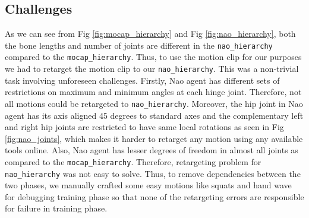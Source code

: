 \subsection{Challenges}
As we can see from Fig \ref{fig:mocap_hierarchy} and Fig \ref{fig:nao_hierarchy}, both the bone lengths and number of joints are different in the \texttt{nao\_hierarchy} compared to the \texttt{mocap\_hierarchy}. Thus, to use the motion clip for our purposes we had to retarget the motion clip to our \texttt{nao\_hierarchy}. This was a non-trivial task involving unforeseen challenges. 
Firstly, Nao agent has different sets of restrictions on maximum and minimum angles at each hinge joint. Therefore, not all motions could be retargeted to \texttt{nao\_hierarchy}. Moreover, the hip joint in Nao agent has its axis aligned 45 degrees to standard axes and the complementary left and right hip joints are restricted to have same local rotations as seen in Fig \ref{fig:nao_joints}, which makes it harder to retarget any motion using any available tools online. Also, Nao agent has lesser degrees of freedom in almost all joints as compared to the \texttt{mocap\_hierarchy}. Therefore, retargeting problem for \texttt{nao\_hierarchy} was not easy to solve. Thus, to remove dependencies between the two phases, we manually crafted some easy motions like squats and hand wave for debugging training phase so that none of the retargeting errors are responsible for failure in training phase.


